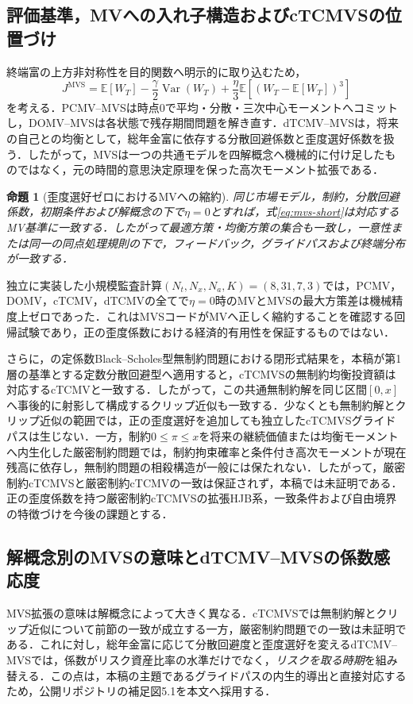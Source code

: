 \documentclass[10pt,a4paper]{article}
\theoremstyle{plain}
\newtheorem{proposition}{命題}
\theoremstyle{definition}
\newcommand{\E}{\mathbb{E}}
\DeclareMathOperator{\Var}{Var}
\begin{document}
\subsection{評価基準，MVへの入れ子構造およびcTCMVSの位置づけ}
終端富の上方非対称性を目的関数へ明示的に取り込むため，
\begin{equation}
J^{\mathrm{MVS}}=\E[W_T]-\frac{\gamma}{2}\Var(W_T)
+\frac{\eta}{3}\E[(W_T-\E[W_T])^3]
\label{eq:mvs-short}
\end{equation}
を考える．PCMV--MVSは時点0で平均・分散・三次中心モーメントへコミットし，DOMV--MVSは各状態で残存期間問題を解き直す．dTCMV--MVSは，将来の自己との均衡として，総年金富に依存する分散回避係数と歪度選好係数を扱う．したがって，MVSは一つの共通モデルを四解概念へ機械的に付け足したものではなく，元の時間的意思決定原理を保った高次モーメント拡張である．

\begin{proposition}[歪度選好ゼロにおけるMVへの縮約]
同じ市場モデル，制約，分散回避係数，初期条件および解概念の下で$\eta=0$とすれば，式\eqref{eq:mvs-short}は対応するMV基準に一致する．したがって最適方策・均衡方策の集合も一致し，一意性または同一の同点処理規則の下で，フィードバック，グライドパスおよび終端分布が一致する．
\end{proposition}

独立に実装した小規模監査計算$(N_t,N_x,N_a,K)=(8,31,7,3)$では，PCMV，DOMV，cTCMV，dTCMVの全てで$\eta=0$時のMVとMVSの最大方策差は機械精度上ゼロであった．これはMVSコードがMVへ正しく縮約することを確認する回帰試験であり，正の歪度係数における経済的有用性を保証するものではない．

さらに，\citet{MuTianYang2019}の定係数Black--Scholes型無制約問題における閉形式結果を，本稿が第1層の基準とする定数分散回避型へ適用すると，cTCMVSの無制約均衡投資額は対応するcTCMVと一致する．したがって，この共通無制約解を同じ区間$[0,x]$へ事後的に射影して構成するクリップ近似も一致する．少なくとも無制約解とクリップ近似の範囲では，正の歪度選好を追加しても独立したcTCMVSグライドパスは生じない．一方，制約$0\leq\pi\leq x$を将来の継続価値または均衡モーメントへ内生化した厳密制約問題では，制約拘束確率と条件付き高次モーメントが現在残高に依存し，無制約問題の相殺構造が一般には保たれない．したがって，厳密制約cTCMVSと厳密制約cTCMVの一致は保証されず，本稿では未証明である．正の歪度係数を持つ厳密制約cTCMVSの拡張HJB系，一致条件および自由境界の特徴づけを今後の課題とする．

\subsection{解概念別のMVSの意味とdTCMV--MVSの係数感応度}
\label{sec:mvs-exploratory}
MVS拡張の意味は解概念によって大きく異なる．cTCMVSでは無制約解とクリップ近似について前節の一致が成立する一方，厳密制約問題での一致は未証明である．これに対し，総年金富に応じて分散回避度と歪度選好を変えるdTCMV--MVSでは，係数がリスク資産比率の水準だけでなく，\emph{リスクを取る時期}を組み替える．この点は，本稿の主題であるグライドパスの内生的導出と直接対応するため，公開リポジトリの補足図5.1を本文へ採用する．
\end{document}
